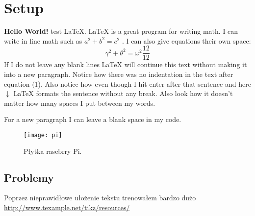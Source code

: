 
\section{Setup}

    \textbf{Hello World!} test \LaTeX. %
    \LaTeX{} is a great program for writing math. I can write in line math such as $a^2+b^2=c^2$ %
    . I can also give equations their own space: 
    \begin{equation} %
    \gamma^2+\theta^2=\omega^2
    \frac{12}{12}
    \end{equation}
    If I do not leave any blank lines \LaTeX{} will continue  this text without making it into a new paragraph.  Notice how there was no indentation in the text after equation (1).  
    Also notice how even though I hit enter after that sentence and here $\downarrow$
    \LaTeX{} formats the sentence without any break.  Also   look  how      it   doesn't     matter          how    many  spaces     I put     between       my    words.

    For a new paragraph I can leave a blank space in my code. 
    
        \begin{figure}[!htb]
            \centering
            \texttt{[image: pi]}
            \caption{Płytka rasebrry Pi.}
        \end{figure}


\subsection{Problemy}
Poprzez nieprawidłowe ułożenie tekstu trenowałem bardzo dużo\\
\href{url}{http://www.texample.net/tikz/resources/}



